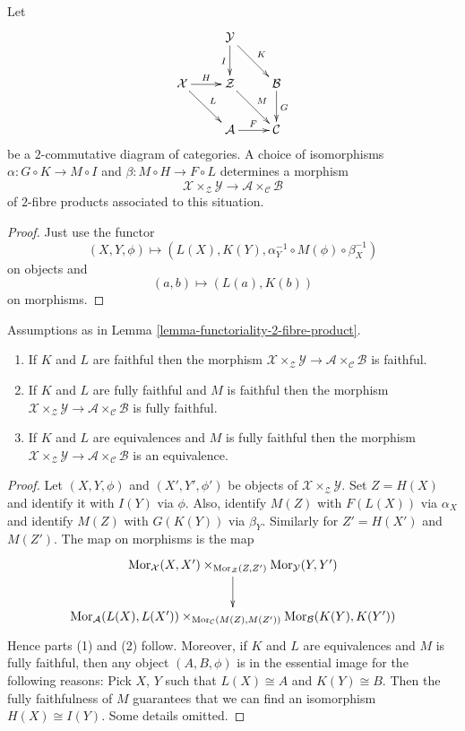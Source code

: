 \begin{lemma}
\label{lemma-functoriality-2-fibre-product}
Let
$$
\xymatrix{
& \mathcal{Y} \ar[d]_I \ar[rd]^K & \\
\mathcal{X} \ar[r]^H \ar[rd]^L &
\mathcal{Z} \ar[rd]^M & \mathcal{B} \ar[d]^G \\
& \mathcal{A} \ar[r]^F & \mathcal{C}
}
$$
be a $2$-commutative diagram of categories.
A choice of isomorphisms
$\alpha : G \circ K \to M \circ I$ and
$\beta : M \circ H \to F \circ L$
determines a morphism
$$
\mathcal{X} \times_\mathcal{Z} \mathcal{Y}
\longrightarrow
\mathcal{A} \times_\mathcal{C} \mathcal{B}
$$
of $2$-fibre products associated to this situation.
\end{lemma}

\begin{proof}
Just use the functor
$$
(X, Y, \phi) \longmapsto (L(X), K(Y),
\alpha^{-1}_Y \circ M(\phi) \circ \beta^{-1}_X)
$$
on objects and
$$
(a, b) \longmapsto (L(a), K(b))
$$
on morphisms.
\end{proof}

\begin{lemma}
\label{lemma-equivalence-2-fibre-product}
Assumptions as in Lemma \ref{lemma-functoriality-2-fibre-product}.
\begin{enumerate}
\item If $K$ and $L$ are faithful
then the morphism
$\mathcal{X} \times_\mathcal{Z} \mathcal{Y} \to
\mathcal{A} \times_\mathcal{C} \mathcal{B}$
is faithful.
\item If $K$ and $L$ are fully faithful and $M$ is faithful
then the morphism
$\mathcal{X} \times_\mathcal{Z} \mathcal{Y} \to
\mathcal{A} \times_\mathcal{C} \mathcal{B}$
is fully faithful.
\item If $K$ and $L$ are equivalences and $M$ is fully faithful
then the morphism
$\mathcal{X} \times_\mathcal{Z} \mathcal{Y} \to
\mathcal{A} \times_\mathcal{C} \mathcal{B}$
is an equivalence.
\end{enumerate}
\end{lemma}

\begin{proof}
Let $(X, Y, \phi)$ and $(X', Y', \phi')$ be objects of
$\mathcal{X} \times_\mathcal{Z} \mathcal{Y}$.
Set $Z = H(X)$ and identify it with $I(Y)$ via $\phi$.
Also, identify $M(Z)$ with $F(L(X))$ via $\alpha_X$ and
identify $M(Z)$ with $G(K(Y))$ via $\beta_Y$. Similarly for
$Z' = H(X')$ and $M(Z')$.
The map on morphisms is the map
$$
\xymatrix{
\Mor_\mathcal{X}(X, X')
\times_{\Mor_\mathcal{Z}(Z, Z')}
\Mor_\mathcal{Y}(Y, Y')
\ar[d] \\
\Mor_\mathcal{A}(L(X), L(X'))
\times_{\Mor_\mathcal{C}(M(Z), M(Z'))}
\Mor_\mathcal{B}(K(Y), K(Y'))
}
$$
Hence parts (1) and (2) follow. Moreover, if $K$ and $L$
are equivalences and $M$ is fully faithful, then any object
$(A, B, \phi)$ is in the essential image for the following reasons:
Pick $X$, $Y$ such that $L(X) \cong A$ and $K(Y) \cong B$.
Then the fully faithfulness of $M$ guarantees that we can
find an isomorphism $H(X) \cong I(Y)$. Some details omitted.
\end{proof}


